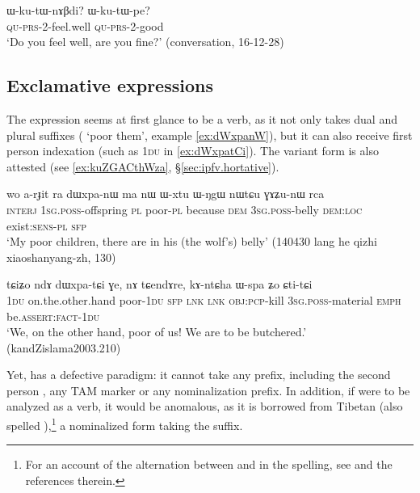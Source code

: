 \begin{exe}
\ex \label{ex:WkutWnABdi}
\gll  ɯ-ku-tɯ-nɤβdi? ɯ-ku-tɯ-pe? \\
 \textsc{qu}-\textsc{prs}-2-feel.well  \textsc{qu}-\textsc{prs}-2-good \\
\glt `Do you feel well, are you fine?' (conversation, 16-12-28)
\end{exe}

\subsection{Exclamative expressions} \label{sec:exclamative.inflectionalization}
The expression  seems at first glance to be a verb, as it not only takes dual and plural suffixes ( `poor them', example \ref{ex:dWxpanW}), but it can also receive first person indexation (such as \textsc{1du} in \ref{ex:dWxpatCi}). The variant form  is also attested (see \ref{ex:kuZGACthWza}, §\ref{sec:ipfv.hortative}).

\begin{exe}
\ex \label{ex:dWxpanW}
\gll wo a-rɟit ra dɯxpa-nɯ ma nɯ ɯ-xtu ɯ-ŋgɯ nɯtɕu ɣɤʑu-nɯ rca  \\
\textsc{interj} \textsc{1sg}.\textsc{poss}-offspring \textsc{pl} poor-\textsc{pl} because \textsc{dem} \textsc{3sg}.\textsc{poss}-belly  \textsc{dem}:\textsc{loc}  exist:\textsc{sens}-\textsc{pl} \textsc{sfp} \\
\glt `My poor children, there are in his (the wolf's) belly' (140430 lang he qizhi xiaoshanyang-zh, 130)
\end{exe}

\begin{exe}
\ex \label{ex:dWxpatCi}
\gll tɕiʑo ndɤ dɯxpa-tɕi ɣe, nɤ tɕendɤre, kɤ-ntɕha ɯ-spa ʑo ɕti-tɕi \\
\textsc{1du} on.the.other.hand poor-\textsc{1du} \textsc{sfp} \textsc{lnk} \textsc{lnk} \textsc{obj}:\textsc{pcp}-kill \textsc{3sg}.\textsc{poss}-material \textsc{emph} be.\textsc{assert}:\textsc{fact}-\textsc{1du} \\
\glt `We, on the other hand, poor of us! We are to be butchered.' (kandZislama2003.210)
\end{exe}

Yet,  has a defective paradigm: it cannot take any prefix, including the second person , any TAM marker or any nominalization prefix. In addition, if  were to be analyzed as a verb, it would be anomalous, as it is borrowed from Tibetan  (also spelled  ),\footnote{For an account of the alternation between  and  in the spelling, see \citet{hill11hb} and the references therein.} a nominalized form taking the  suffix. 

